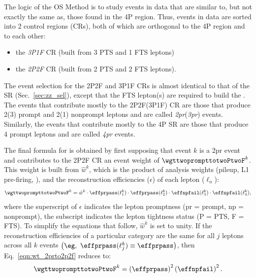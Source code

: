 The logic of the OS Method is to study events in data that are similar to, but not exactly the same as, those found in the 4P region.
Thus, events in data are sorted into 2 control regions (CRs), both of which are orthogonal to the 4P region and to each other:
\begin{itemize}
	\item the \emph{3P1F} CR (built from 3 PTS and 1 FTS leptons)
	\item the \emph{2P2F} CR (built from 2 PTS and 2 FTS leptons).
\end{itemize}
The event selection for the 2P2F and 3P1F CRs is almost identical to that of the SR (Sec.~\ref{sec:zz_sel}),
except that the FTS lepton(s) are required to build the \Ztwo.
The events that contribute mostly to the 2P2F(3P1F) CR are those that produce 2(3) prompt and 2(1) nonprompt leptons and are called \emph{2pr}(\emph{3pr}) events.
Similarly, the events that contribute mostly to the 4P SR are those that produce 4 prompt leptons and are called \emph{4pr} events.

The final formula for \nfourPRB is obtained by first supposing that event $k$ is a 2pr event and contributes to the 2P2F CR an event weight of $\wgttwoprompttotwoPtwoF^k$.
This weight is built from $\hat{w}^k$, which is the product of analysis weights (pileup, L1 pre-firing, \etc), and the reconstruction efficiencies ($\epsilon$) of each lepton ($\ell_n$):
\begin{equation}
	\label{eqn:wt_2prto2p2f}
	\wgttwoprompttotwoPtwoF^k = \hat{w}^k \cdot \effprpass(\ell_1^k) \cdot \effprpass(\ell_2^k) \cdot \effnpfail(\ell_3^k) \cdot \effnpfail(\ell_4^k),
\end{equation}
where the superscript of $\epsilon$ indicates the lepton promptness (pr = prompt, np = nonprompt),
the subscript indicates the lepton tightness status (P = PTS, F = FTS).
To simplify the equations that follow, $\hat{w}^k$ is set to unity.
If the reconstruction efficiencies of a particular category are the same for all $j$ leptons across all $k$ events $\left( \eg, ~ \effprpass(\ell_j^k) \equiv \effprpass \right)$, then Eq.~\ref{eqn:wt_2prto2p2f} reduces to:
\begin{equation}
	\label{eqn:wt_2prto2p2f_simp}
	\wgttwoprompttotwoPtwoF^k = 
	\left( \effprpass \right)^2 
	\left( \effnpfail \right)^2.
\end{equation}

